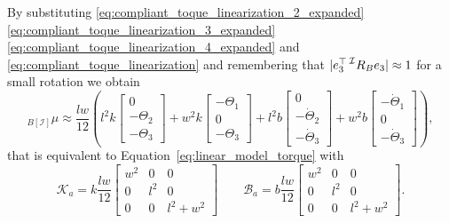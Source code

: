 By substituting \eqref{eq:compliant_toque_linearization_2_expanded} \eqref{eq:compliant_toque_linearization_3_expanded} \eqref{eq:compliant_toque_linearization_4_expanded} and \eqref{eq:compliant_toque_linearization} and remembering that $|e _ 3^\top \prescript{\mathcal{I}}{}{R} _B e _ 3| \approx 1$ for a small rotation we obtain
\begin{equation}
    {}_{B[\mathcal{I}]} \mu \approx \frac{lw}{12} \left(l^2 k \begin{bmatrix}
    0 \\
    -\Theta_2 \\
    - \Theta_3
    \end{bmatrix} 
    + w^2 k \begin{bmatrix}
    -\Theta_1 \\
    0 \\
    - \Theta_3
    \end{bmatrix}
    + l^2 b \begin{bmatrix}
    0 \\
    -\dot{\Theta}_2 \\
    - \dot{\Theta}_3
    \end{bmatrix} 
    + w^2 b \begin{bmatrix}
    -\dot{\Theta}_1 \\
    0 \\
    - \dot{\Theta}_3
    \end{bmatrix}\right),
\end{equation}
that  is equivalent to Equation~\eqref{eq:linear_model_torque} with 
\begin{equation}
\mathcal{K}_a =  k \frac{l w}{12} \begin{bmatrix} w ^ 2 & 0 & 0 \\ 
0 & l ^ 2 & 0 \\ 
0 & 0& l ^2 {+} w ^2 \end{bmatrix}
\quad \quad \mathcal{B}_a =  b \frac{l w}{12} \begin{bmatrix} w ^ 2 & 0 & 0 \\ 
0 & l ^ 2 & 0 \\ 
0 & 0& l ^2 {+} w ^2 \end{bmatrix}.
\end{equation}

